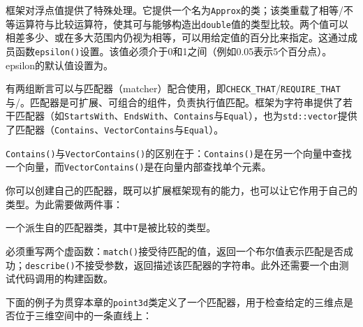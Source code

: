 
框架对浮点值提供了特殊处理。它提供一个名为\texttt{Approx}的类；该类重载了相等/不等运算符与比较运算符，使其可与能够构造出\texttt{double}值的类型比较。两个值可以相差多少、或在多大范围内仍视为相等，可以用给定值的百分比来指定。这通过成员函数\texttt{epsilon()}设置。该值必须介于0和1之间（例如0.05表示5个百分点）。epsilon的默认值设置为。


有两组断言可以与匹配器（matcher）配合使用，即\texttt{CHECK\_\allowbreak{}THAT}/\texttt{REQUIRE\_\allowbreak{}THAT}与/。匹配器是可扩展、可组合的组件，负责执行值匹配。框架为字符串提供了若干匹配器（如\texttt{StartsWith}、\texttt{EndsWith}、\texttt{Contains}与\texttt{Equal}），也为\texttt{std::\allowbreak{}vector}提供了匹配器（\texttt{Contains}、\texttt{VectorContains}与\texttt{Equal}）。



\begin{myNote}[tip]
\texttt{Contains()}与\texttt{VectorContains()}的区别在于：\texttt{Contains()}是在另一个向量中查找一个向量，而\texttt{VectorContains()}是在向量内部查找单个元素。
\end{myNote}



你可以创建自己的匹配器，既可以扩展框架现有的能力，也可以让它作用于自己的类型。为此需要做两件事：



一个派生自的匹配器类，其中\texttt{T}是被比较的类型。



必须重写两个虚函数：\texttt{match()}接受待匹配的值，返回一个布尔值表示匹配是否成功；\texttt{describe()}不接受参数，返回描述该匹配器的字符串。此外还需要一个由测试代码调用的构建函数。



下面的例子为贯穿本章的\texttt{point3d}类定义了一个匹配器，用于检查给定的三维点是否位于三维空间中的一条直线上：



